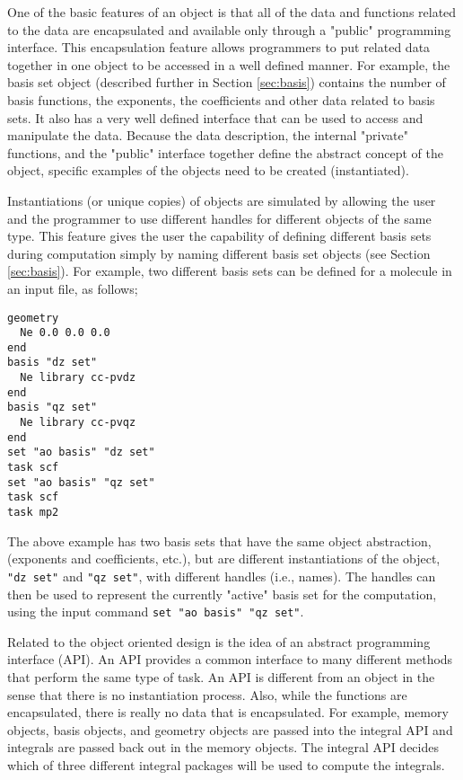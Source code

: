 One of the basic features of an object is that all of the data and
functions related to the data are encapsulated and available only through
a "public" programming interface.  This encapsulation feature allows 
programmers to put related
data together in one object to be accessed in a well defined manner.
For example, the basis set object (described further in Section
\ref{sec:basis}) contains the number of basis functions, the
exponents, the coefficients and other data related to basis sets.
It also has a very well defined interface that can be used to access and
manipulate the data.  Because the data description, the internal "private"
functions, and the "public" interface together 
define the abstract concept of the object, specific examples of the
objects need to be created (instantiated).

Instantiations (or unique copies) of objects are simulated by allowing 
the user and the programmer to use different handles for different 
objects of the same type.
This feature gives the user the capability of defining
different basis sets during computation simply by naming different
basis
set objects (see Section \ref{sec:basis}).  For example, two different basis sets
can be defined for a molecule in an input file, as follows;

\begin{verbatim}
geometry
  Ne 0.0 0.0 0.0
end
basis "dz set"
  Ne library cc-pvdz
end
basis "qz set"
  Ne library cc-pvqz
end
set "ao basis" "dz set"
task scf
set "ao basis" "qz set"
task scf
task mp2
\end{verbatim}

The above example has two basis sets that have the same object abstraction,
(exponents and coefficients, etc.), but are different instantiations of
the object, \verb+"dz set"+ and \verb+"qz set"+, with different handles (i.e., names).
The handles can then be used to represent the currently "active" basis set for
the computation, using the input command
\verb+set "ao basis" "qz set"+.

Related to the object oriented design is the idea of an abstract programming
interface (API).  An API provides a common interface to many different
methods that perform the same type of task.  An API is different from an
object in the sense that there is no instantiation process.  Also, while the
functions are encapsulated, there is really no data that is encapsulated.
For example, memory objects, basis objects, and geometry objects are
passed into the integral API and integrals are passed back out in the
memory objects.  The integral API decides which of three different
integral packages will be used to compute the integrals.


